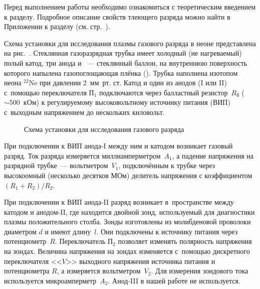 


Перед выполнением работы необходимо ознакомиться с 
теоретическим введением к разделу.
Подробное описание свойств тлеющего разряда можно найти в Приложении к разделу
(см. стр.~\pageref{sec:discharge}).

Схема установки для исследования плазмы газового разряда в неоне представлена на
рис.~. Стеклянная газоразрядная
трубка имеет холодный (не нагреваемый) полый катод, три анода и
~--- стеклянный баллон, на
внутреннюю поверхность которого напылена газопоглощающая плёнка
(). Трубка наполнена изотопом неона
$^{22}$Ne при давлении 2~мм~рт. ст. Катод и один из анодов (I или II) с~помощью
переключателя $\text{П}_1$ подключаются через
балластный резистор~$R_\text{б}$ ($\sim500$~кОм) к регулируемому высоковольтному
источнику питания (ВИП) с~выходным
напряжением до нескольких киловольт.

\begin{figure}[h!]
    \centering
    \footnotesize
	\caption{Схема установки для исследования газового разряда}
\end{figure}

При подключении к ВИП анода-I между ним и катодом возникает газовый разряд. Ток
разряда измеряется миллиамперметром~$A_1$, а падение напряжения на разрядной трубке~--- 
вольтметром~$V_{1}$, подключённым к трубке через
высокоомный (несколько десятков МОм) делитель напряжения с коэффициентом
$(R_1+R_2)/R_2$.

При подключении к ВИП анода-II разряд возникает в~пространстве между катодом и
анодом-II, где находится двойной зонд,
используемый для диагностики плазмы положительного столба. Зонды изготовлены из
молибденовой проволоки диаметром
$d$ и имеют длину~$l$. Они подключены к источнику питания через
потенциометр~$R$. Переключатель
$\text{П}_2$ позволяет изменять полярность напряжения на зондах. Величина
напряжения на зондах изменяется с~помощью дискретного
переключателя <<$V$>> выходного напряжения источника питания и потенциометра
$R$, а измеряется вольтметром~$V_2$. Для
измерения зондового тока используется микроамперметр~$A_2$.
Анод-III в нашей работе не используется.

